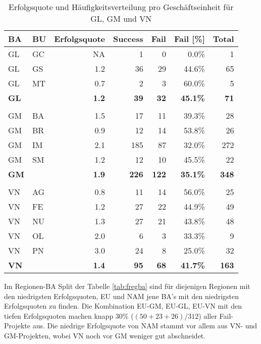 \begin{table}[htpb]
	\centering
	\caption{Erfolgsquote und Häufigkeitsverteilung pro Geschäftseinheit für GL, GM und VN}
	\begin{tabular}{llrrrrr}
		\textbf{BA} & \textbf{BU} & \multicolumn{1}{l}{\textbf{Erfolgsquote}} & \multicolumn{1}{l}{\textbf{Success}} & \multicolumn{1}{l}{\textbf{Fail}} & \multicolumn{1}{l}{\textbf{Fail [\%]}} & \multicolumn{1}{l}{\textbf{Total}} \\\hline
		GL    & GC    & NA    & 1     & 0     & 0.0\% & 1 \\
		GL    & GS    & 1.2   & 36    & 29    & 44.6\% & 65 \\
		GL    & MT    & 0.7   & 2     & 3     & 60.0\% & 5 \\\hline
		\textbf{GL} &  & \textbf{1.2} & \textbf{39} &\textbf{32} & \textbf{45.1\%} & \textbf{71}\\
		      &       &       &       &       &        &   \\
		GM    & BA    & 1.5   & 17    & 11    & 39.3\% & 28 \\
		GM    & BR    & 0.9   & 12    & 14    & 53.8\% & 26 \\
		GM    & IM    & 2.1   & 185   & 87    & 32.0\% & 272 \\
		GM    & SM    & 1.2   & 12    & 10    & 45.5\% & 22 \\\hline
		\textbf{GM} &  & \textbf{1.9} & \textbf{226} &\textbf{122} & \textbf{35.1\%} & \textbf{348}\\
		      &       &       &       &       &        &   \\
		VN    & AG    & 0.8   & 11    & 14    & 56.0\% & 25 \\
		VN    & FE    & 1.2   & 27    & 22    & 44.9\% & 49 \\
		VN    & NU    & 1.3   & 27    & 21    & 43.8\% & 48 \\
		VN    & OL    & 2.0   & 6     & 3     & 33.3\% & 9 \\
		VN    & PN    & 3.0   & 24    & 8     & 25.0\% & 32 \\\hline
		\textbf{VN} &  & \textbf{1.4} & \textbf{95} &\textbf{68} & \textbf{41.7\%} & \textbf{163}\\
	\end{tabular}%
	\label{fbabu}%
\end{table}%
\newline Im Regionen-BA Split der Tabelle \ref{tab:fregba} sind für diejenigen Regionen mit den niedrigsten Erfolgsquoten, EU und NAM jene BA's mit den niedrigsten Erfolgsquoten zu finden. Die Kombination EU-GM, EU-GL, EU-VN mit den tiefen Erfolgsquoten machen knapp 30\% ($(50+23+26)/312$) aller Fail-Projekte aus. Die niedrige Erfolgsquote von NAM stammt vor allem aus VN- und GM-Projekten, wobei VN noch vor GM weniger gut abschneidet.
